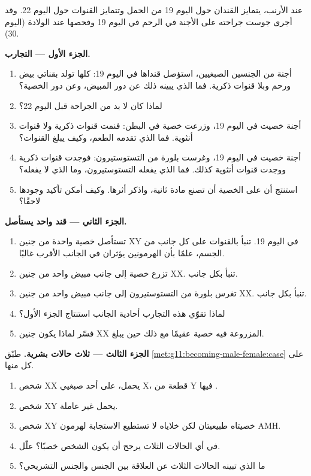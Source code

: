 \begin{problem}
\label{pb:g11:becoming-male-female:1}
عند الأرنب، يتمايز القندان حول اليوم 19 من الحمل وتتمايز القنوات حول
اليوم 22. وقد أجرى جوست جراحته على الأجنة في الرحم في اليوم 19 وفحصها
عند الولادة (اليوم 30).

\medskip
\noindent\textbf{الجزء الأول --- التجارب.}
\begin{enumerate}
  \item أجنة من الجنسين الصبغيين، استؤصل قنداها في اليوم 19: كلها
        تولد بقناتي بيض ورحم وبلا قنوات ذكرية. فما الذي يبينه ذلك عن
        دور المبيض، وعن دور الخصية؟
  \item لماذا كان لا بد من الجراحة قبل اليوم 22؟
  \item أجنة خصيت في اليوم 19، وزرعت خصية في البطن: فنمت قنوات ذكرية
        ولا قنوات أنثوية. فما الذي تقدمه الطعم، وكيف يبلغ القنوات؟
  \item أجنة خصيت في اليوم 19، وغرست بلورة من التستوستيرون: فوجدت
        قنوات ذكرية ووجدت قنوات أنثوية كذلك. فما الذي يفعله
        التستوستيرون، وما الذي لا يفعله؟
  \item استنتج أن على الخصية أن تصنع مادة ثانية، واذكر أثرها. وكيف
        أمكن تأكيد وجودها لاحقًا؟
\end{enumerate}

\medskip
\noindent\textbf{الجزء الثاني --- قند واحد يستأصل.}
\begin{enumerate}[resume]
  \item تستأصل خصية واحدة من جنين XY في اليوم 19. تنبأ بالقنوات على كل
        جانب من الجسم، علمًا بأن الهرمونين يؤثران في الجانب الأقرب
        غالبًا.
  \item تزرع خصية إلى جانب مبيض واحد من جنين XX. تنبأ بكل جانب.
  \item تغرس بلورة من التستوستيرون إلى جانب مبيض واحد من جنين XX.
        تنبأ بكل جانب.
  \item لماذا تقوّي هذه التجارب أحادية الجانب استنتاج الجزء الأول؟
  \item فسّر لماذا يكون جنين XX المزروعة فيه خصية عقيمًا مع ذلك حين
        يبلغ.
\end{enumerate}

\medskip
\noindent\textbf{الجزء الثالث --- ثلاث حالات بشرية.}
طبّق \cref{met:g11:becoming-male-female:case} على كل منها.
\begin{enumerate}[resume]
  \item شخص XX يحمل، على أحد صبغيي X، قطعة من Y فيها .
  \item شخص XY يحمل  غير عاملة.
  \item شخص XY خصيتاه طبيعيتان لكن خلاياه لا تستطيع الاستجابة لهرمون AMH.
  \item في أي الحالات الثلاث يرجح أن يكون الشخص خصبًا؟ علّل.
  \item ما الذي تبينه الحالات الثلاث عن العلاقة بين الجنس 
        والجنس التشريحي؟
\end{enumerate}


\end{problem}
